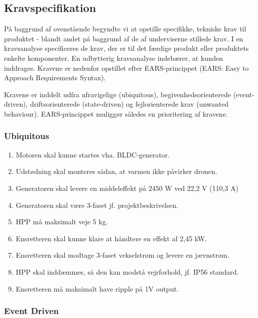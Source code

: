 \subsection{Kravspecifikation}
\label{sec:kravspecifikation}

På baggrund af ovenstående begyndte vi at opstille specifikke, tekniske krav til produktet - blandt andet på baggrund af de af underviserne stillede krav. I en kravsanalyse specificeres de krav, der er til det færdige produkt eller produktets enkelte komponenter. En udbytterig kravsanalyse indebærer, at kunden inddrages. Kravene er nedenfor opstillet efter EARS-princippet (EARS: Easy to Approach Requirements Syntax).

Kravene er inddelt udfra ufravigelige (ubiquitous), begivenhedsorienterede (event-driven), driftsorienterede (state-driven) og fejlorienterede krav (unwanted behaviour). EARS-princippet muliggør således en prioritering af kravene.

\subsubsection{Ubiquitous}
\label{sec:kravspecifikation-1}

\begin{enumerate}[label=2.1.1.\arabic*]
\item Motoren skal kunne startes vha. BLDC-generator.
\item Udstødning skal monteres sådan, at varmen ikke påvirker dronen.
\item Generatoren skal levere en middeleffekt på 2450 W ved 22,2 V (110,3 A)
\item Generatoren skal være 3-faset jf. projektbeskrivelsen.
\item HPP må maksimalt veje 5 kg.
\item Ensretteren skal kunne klare at håndtere en effekt af 2,45 kW.
\item Ensretteren skal modtage 3-faset vekselstrøm og levere en jævnstrøm.
\item HPP skal inddæmmes, så den kan modstå vejrforhold, jf. IP56 standard.
\item Ensretteren må maksimalt have ripple på 1V output.
\end{enumerate}

\subsubsection{Event Driven}
\label{sec:kravspecifikation-2}

